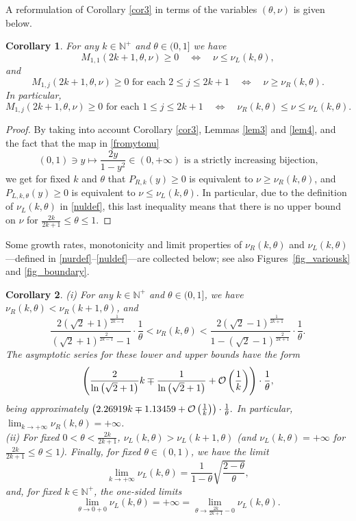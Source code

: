 \documentclass[smallextended,numbook,runningheads]{svjour3}     %
\newtheorem{corollary}{Corollary}
\newtheorem{corollary}{Corollary}
\newcommand{\te}{\theta}
\newcommand{\nul}{\nu_L(k,\theta)}
\newcommand{\nur}{\nu_R(k,\theta)}
\newcommand{\nplus}{\mathbb{N}^+}
\newcommand{\Por}{P_{R,k}(y)}
\newcommand{\Pol}{P_{L,k,\te}(y)}
\begin{document}
A reformulation of Corollary \ref{cor3} in terms of the variables $(\te,\nu)$ is given below.
\begin{corollary}\label{cor4}
For any $k\in\nplus$ and $\te\in(0,1]$ we have 
\[
M_{1,1}(2k+1,\te,\nu)\ge 0 \quad \Longleftrightarrow \quad \nu\le\nul,
\] 
and
\[
M_{1,j}(2k+1,\te,\nu)\ge 0 \text{  for each } 2\le j\le 2k+1 \quad \Longleftrightarrow \quad \nu\ge\nur.
\] 
In particular, 
\[
M_{1,j}(2k+1,\te,\nu)\ge 0 \text{  for each } 1\le j\le 2k+1  \quad \Longleftrightarrow \quad \nur\le\nu\le\nul.
\] 
\end{corollary}
\begin{proof} By taking into account Corollary \ref{cor3}, Lemmas \ref{lem3} and \ref{lem4}, and the fact that the map in \eqref{fromytonu} 
\begin{equation}\label{cor4bijection}
(0,1)\ni y\mapsto\frac{2y}{1-y^2}\in(0,+\infty)\text{ is a strictly increasing bijection,}
\end{equation}
we get for fixed $k$ and $\te$ that $\Por\ge 0$ is equivalent to $\nu\ge\nur$, and
$\Pol\ge 0$ is equivalent to $\nu\le\nul$. In particular, due to the definition of $\nul$ in \eqref{nuldef}, this last inequality means that there is no upper bound on $\nu$ for $\frac{2k}{2k+1}\le \te\le 1$.
\end{proof}
Some growth rates, monotonicity and limit properties of $\nur$ and $\nul$---defined in 
\eqref{nurdef}--\eqref{nuldef}---are collected below; 
see also Figures~\ref{fig_variousk} and \ref{fig_boundary}.
\begin{corollary}\label{cor5} (i) For any $k\in\nplus$ and $\te\in(0,1]$, we have $\nur<\nu_R(k+1,\theta)$, and
\begin{equation}\label{cor5lowerupper}
\frac{2 \left(\sqrt{2}+1\right)^{\frac{1}{2 k-1}}}{\left(\sqrt{2}+1\right)^{\frac{2}{2
   k-1}}-1}\cdot\frac{1}{\te}<\nur<\frac{2 \left(\sqrt{2}-1\right)^{\frac{1}{2 k+1}}}{1-\left(\sqrt{2}-1\right)^{\frac{2}{2
   k+1}}}\cdot\frac{1}{\te}.
\end{equation}
The asymptotic series for these lower and upper bounds have the form
\[
\left( \frac{2}{\ln \left(\sqrt{2}+1\right)}k\mp\frac{1}{\ln \left(\sqrt{2}+1\right)}+ {\cal{O}}\left(\frac{1}{k}\right)\right)\cdot\frac{1}{\te},
\]
being approximately
$
\left( 2.26919 k\mp1.13459+ {\cal{O}}\left(\frac{1}{k}\right)\right)\cdot\frac{1}{\te}.
$
In particular, $\lim_{k\to+\infty} \nur=+\infty$.\\
(ii) For fixed $0<\te<\frac{2k}{2k+1}$, $\nul>\nu_L(k+1,\theta)$ (and $\nul =+\infty$ for $\frac{2k}{2k+1}\le\te\le 1$). Finally, for fixed $\te\in(0,1)$, we have the limit
\begin{equation}\label{cor5klim}
\lim_{k\to+\infty} \nul=\frac{1}{1-\theta }\sqrt{\frac{2-\theta }{\theta }},
\end{equation}
and, for fixed $k\in\nplus$, the one-sided limits  
\begin{equation}\label{cor5thetalim}
\lim_{\te\to 0+0} \nul=+\infty=\lim_{\te\to\frac{2k}{2k+1}-0} \nul.
\end{equation}
\end{corollary}
\end{document}
